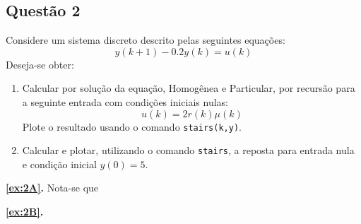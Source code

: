 \documentclass{article}
\begin{document}
\newpage

        \subsection{Questão 2}
            \begin{exercise}
                Considere um sistema discreto descrito pelas seguintes equações:
                    \begin{equation*}
                        y(k+1) - 0.2y(k) = u(k)
                    \end{equation*}
                Deseja-se obter:
                    \begin{enumerate}[label=(\alph*), rightmargin = \leftmargin]
                        \item \label{ex:2A}Calcular por solução da equação, Homogênea e Particular, por recursão para a seguinte entrada com condições iniciais nulas:
                            \begin{equation*}
                                u(k) = 2r(k)\mu(k)
                            \end{equation*}
                        Plote o resultado usando o comando \texttt{stairs(k,y)}.

                        \item \label{ex:2B}Calcular e plotar, utilizando o comando \texttt{stairs}, a reposta para entrada nula e condição inicial $y(0) = 5$.
                    \end{enumerate}
            \end{exercise}
\newpage
            \begin{resolution}
                \textbf{\ref{ex:2A}.} Nota-se que 
            \end{resolution}
\newpage
            \begin{resolution}
                \textbf{\ref{ex:2B}.} 
            \end{resolution}
\end{document}
